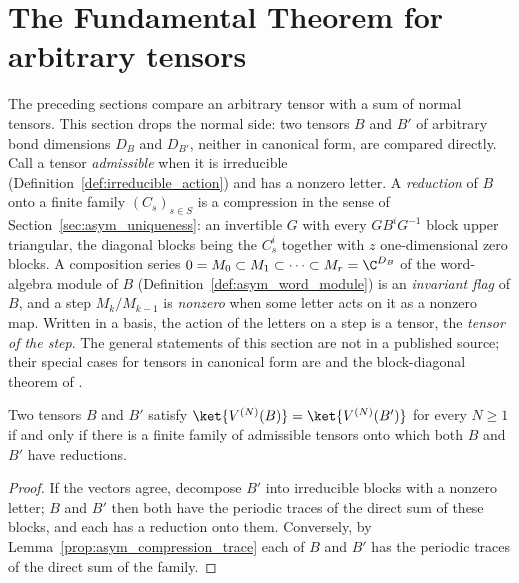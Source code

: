 \section{The Fundamental Theorem for arbitrary tensors}%
\label{sec:asym_arbitrary}

The preceding sections compare an arbitrary tensor with a sum of normal
tensors. This section drops the normal side: two tensors $B$ and $B'$ of
arbitrary bond dimensions $D_B$ and $D_{B'}$, neither in canonical form, are
compared directly. Call a tensor \emph{admissible} when it is irreducible
(Definition~\ref{def:irreducible_action}) and has a nonzero letter. A
\emph{reduction} of $B$ onto a finite family $(C_s)_{s\in S}$ is a
compression in the sense of Section~\ref{sec:asym_uniqueness}: an invertible
$G$ with every $GB^iG^{-1}$ block upper triangular, the diagonal blocks being
the $C_s^i$ together with $z$ one-dimensional zero blocks. A composition
series $0=M_0\subset M_1\subset\cdots\subset M_r=\C^{D_B}$ of the word-algebra
module of $B$ (Definition~\ref{def:asym_word_module}) is an \emph{invariant
    flag} of $B$, and a step $M_k/M_{k-1}$ is \emph{nonzero} when some letter
acts on it as a nonzero map. Written in a basis, the action of the letters on
a step is a tensor, the \emph{tensor of the step}. The general statements of
this section are not in a published source; their special cases for tensors
in canonical form are \cite[Theorem~2.10]{Cirac2016MPDO_arXiv} and the
block-diagonal theorem of \cite{DeLasCuevas2017Irreducible}.

\begin{theorem}
    \label{thm:asym_arbitrary_ft}
    \leanok
    Two tensors $B$ and $B'$ satisfy
    $\ket{V^{(N)}(B)}=\ket{V^{(N)}(B')}$ for every $N\geq1$ if and only if
    there is a finite family of admissible tensors onto which both $B$ and
    $B'$ have reductions.
\end{theorem}

\begin{proof}
    \leanok
    If the vectors agree, decompose $B'$ into irreducible blocks with a
    nonzero letter; $B$ and $B'$ then both have the periodic traces of the
    direct sum of these blocks, and each has a reduction onto them.
    Conversely, by Lemma~\ref{prop:asym_compression_trace} each of $B$ and
    $B'$ has the periodic traces of the direct sum of the family.
\end{proof}

